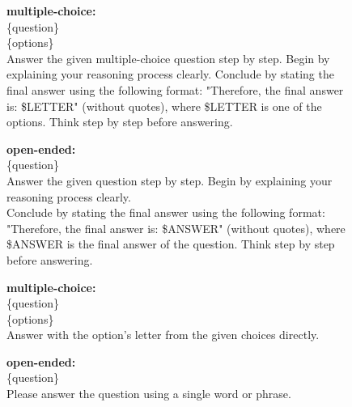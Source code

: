 \begin{figure}[h]
\begin{tcolorbox}[colback=black!7.5!white, colframe=black!80!white, title={\eval -- For Qwen series thinking models, GPT-5.4, Gemini 3 Pro, Claude Opus 4.5 and InternVL3.5-8B}, fontupper=\footnotesize, fontlower=\footnotesize, fonttitle=\footnotesize]

\textbf{multiple-choice:}\\
\{question\}\\
\{options\}\\
Answer the given multiple-choice question step by step. Begin by explaining your
reasoning process clearly. Conclude by stating the final answer using the following
format: "Therefore, the final answer is: \$LETTER" (without quotes), where \$LETTER is one of the options. Think step by step before answering.

\tcblower
\textbf{open-ended:}\\
\{question\}\\
Answer the given question step by step. Begin by explaining your reasoning process
clearly.\\
Conclude by stating the final answer using the following format: "Therefore, the final answer is: \$ANSWER" (without quotes), where \$ANSWER is the final answer of the question. Think step by step before answering.

\end{tcolorbox}
\end{figure}


\begin{figure}[h]
\begin{tcolorbox}[colback=black!7.5!white, colframe=black!80!white, title=\eval -- For Qwen series instruct models and other models, fontupper=\footnotesize, fontlower=\footnotesize, fonttitle=\footnotesize]

\textbf{multiple-choice:}\\
\{question\}\\
\{options\}\\
Answer with the option’s letter from the given choices directly.

\tcblower
\textbf{open-ended:}\\
\{question\}\\
Please answer the question using a single word or phrase.

\end{tcolorbox}
\end{figure}
